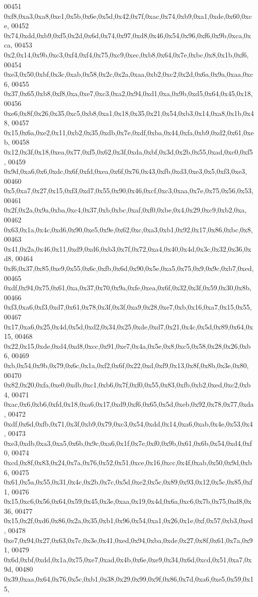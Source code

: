 \begin{DoxyCode}
00451   0xf8,0xa3,0xa8,0xe1,0x5b,0x6e,0x5d,0x42,0x7f,0xac,0x74,0xb9,0xa1,0xde,0x60,0xce,
00452   0x74,0xdd,0xb9,0xf5,0x2d,0x6d,0x74,0x97,0xd8,0x46,0x54,0x96,0xf6,0x9b,0xca,0xca,
00453   0x2,0x14,0x9b,0xc3,0xf4,0xf4,0x75,0xc9,0xec,0xb8,0x64,0x7e,0xbc,0x8,0x1b,0xf6,
00454   0xe3,0x50,0xbf,0x3c,0xab,0x58,0x2c,0x2a,0xaa,0xb2,0xc2,0x2d,0x6a,0x9a,0xaa,0xc6,
00455   0x37,0x65,0xb8,0xf8,0xa,0xe7,0xc3,0xa2,0x94,0xd1,0xa,0x9b,0xd5,0x64,0x45,0x18,
00456   0xe6,0x8f,0x26,0x35,0xc5,0xb8,0xa1,0x18,0x35,0x21,0x54,0xb3,0x14,0xa8,0x1b,0x48,
00457   0x15,0x6a,0xe2,0x11,0xb2,0x35,0xdb,0x7e,0xdf,0xba,0x44,0xfa,0xb9,0xd2,0x61,0xeb,
00458   0x12,0x3f,0x18,0xea,0x77,0xf5,0x62,0x3f,0xda,0xbf,0x3d,0x2b,0x55,0xad,0xc0,0xf5,
00459   0x9d,0xa6,0x6,0xdc,0x6f,0xfd,0xea,0x6f,0x76,0x43,0xfb,0xd3,0xe3,0x5,0xf3,0xe3,
00460   0x5,0xa7,0x27,0x15,0xf3,0xd7,0x55,0x90,0x46,0xcf,0xc3,0xaa,0x7e,0x75,0x56,0x53,
00461   0x2f,0x2a,0x9a,0xba,0xc4,0x37,0xb,0xbc,0xaf,0xf0,0xbe,0x4,0x29,0xc9,0xb2,0xa,
00462   0x63,0x1a,0x4c,0xd6,0x90,0xe5,0x9e,0x62,0xc,0xa3,0xb1,0x92,0x17,0x86,0xbc,0x8,
00463   0x41,0x2a,0x46,0x11,0xd9,0xd6,0xb3,0x7f,0x72,0xa4,0x40,0x4d,0x3c,0x32,0x36,0xd8,
00464   0xf6,0x37,0x85,0xe9,0x55,0x6c,0xfb,0x6d,0x90,0x5e,0xa5,0x75,0x9,0x9c,0xb7,0xed,
00465   0xdf,0x94,0x75,0x61,0xa,0x37,0x70,0x9a,0xfe,0xea,0x6f,0x32,0x3f,0x59,0x30,0x8b,
00466   0xf3,0xa6,0xf3,0xd7,0x61,0x78,0x3f,0x3f,0xa9,0x28,0xe7,0xb,0x16,0xa7,0x15,0x55,
00467   0x17,0xa6,0x25,0x4d,0x5d,0xd2,0x34,0x25,0xde,0xd7,0x21,0x4c,0x5d,0x89,0x64,0x15,
00468   0x22,0x15,0xde,0xd4,0xd8,0xcc,0x91,0xe7,0x4a,0x5e,0x8,0xc5,0x58,0x28,0x26,0xb6,
00469   0xb,0x54,0x9b,0x79,0x6c,0x1a,0xf2,0x6f,0x22,0xd,0xf9,0x13,0x8f,0x8b,0x3e,0x80,
00470   0x82,0x20,0xfa,0xe0,0xdb,0xc1,0xb6,0x7f,0xf0,0x55,0x83,0xfb,0xb2,0xed,0xc2,0xb4,
00471   0xac,0x6,0xb6,0xfd,0x18,0xa6,0x17,0xd9,0xf6,0x65,0x5d,0xeb,0x92,0x78,0x77,0xda,
00472   0xdf,0x6d,0xfb,0x71,0x3f,0xb9,0x79,0xc3,0x54,0xdd,0x14,0xa6,0xab,0x4e,0x53,0x4,
00473   0xe3,0xdb,0xa3,0xa5,0x6b,0x9c,0xa6,0x1f,0x7e,0xf0,0x9b,0x61,0x6b,0x54,0xd4,0xf0,
00474   0xcd,0x8f,0x83,0x24,0x7a,0x76,0x52,0x51,0xce,0x16,0xcc,0x4f,0xab,0x50,0x9d,0xb6,
00475   0x61,0x5a,0x55,0x31,0x4c,0x2b,0x7c,0x5d,0xe2,0x5c,0x89,0x93,0x12,0x5c,0x85,0xf1,
00476   0x15,0xc6,0x56,0x64,0x59,0x45,0x3e,0xaa,0x19,0x4d,0x6a,0xc6,0x7b,0x75,0xd8,0x36,
00477   0x15,0x2f,0xd6,0x86,0x2a,0x35,0xb1,0x96,0x54,0xa1,0x26,0x1e,0xf,0x57,0xb3,0xed,
00478   0xe7,0x94,0x27,0x63,0x7c,0x3e,0x41,0xed,0x94,0xba,0xde,0x27,0x8f,0x61,0x7a,0x91,
00479   0x6d,0xbf,0xdd,0x1a,0x75,0xe7,0xad,0x4b,0x6e,0xe9,0x34,0x6d,0xcd,0x51,0xa7,0x9d,
00480   0x39,0xaa,0x64,0x76,0x5c,0xb1,0x38,0x29,0x99,0x9f,0x86,0x7d,0xa6,0xe5,0x59,0x15,

\end{DoxyCode}

